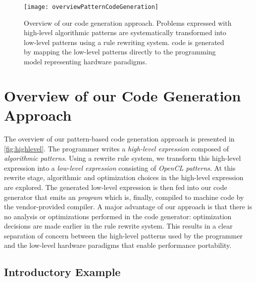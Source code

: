 \begin{figure}[tb]
\centering
\texttt{[image: overviewPatternCodeGeneration]}
\caption[Overview of our code generation approach.]{
Overview of our code generation approach.
Problems expressed with  high-level algorithmic patterns are systematically transformed into low-level \OpenCL patterns using a rule rewriting system.
\OpenCL code is generated by mapping the low-level patterns directly to the \OpenCL programming model representing hardware paradigms.
}
\label{fig:highlevel}
\end{figure}

\section{Overview of our Code Generation Approach}
\label{section:code-generation:overview}

The overview of our pattern-based code generation approach is presented in \autoref{fig:highlevel}.
The programmer writes a \emph{high-level expression} composed of \emph{algorithmic patterns}.
Using a rewrite rule system, we transform this high-level expression into a \emph{low-level expression} consisting of \emph{OpenCL patterns}.
At this rewrite stage, algorithmic and optimization choices in the high-level expression are explored.
The generated low-level expression is then fed into our code generator that emits an \emph{\OpenCL program} which is, finally, compiled to machine code by the vendor-provided \OpenCL compiler.
A major advantage of our approach is that there is no analysis or optimizations performed in the code generator:
optimization decisions are made earlier in the rule rewrite system.
This results in a clear separation of concern between the high-level patterns used by the programmer and the low-level hardware paradigms that enable performance portability.


\subsection{Introductory Example}

